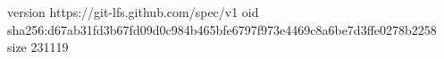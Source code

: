 version https://git-lfs.github.com/spec/v1
oid sha256:d67ab31fd3b67fd09d0c984b465bfe6797f973e4469c8a6be7d3ffe0278b2258
size 231119
